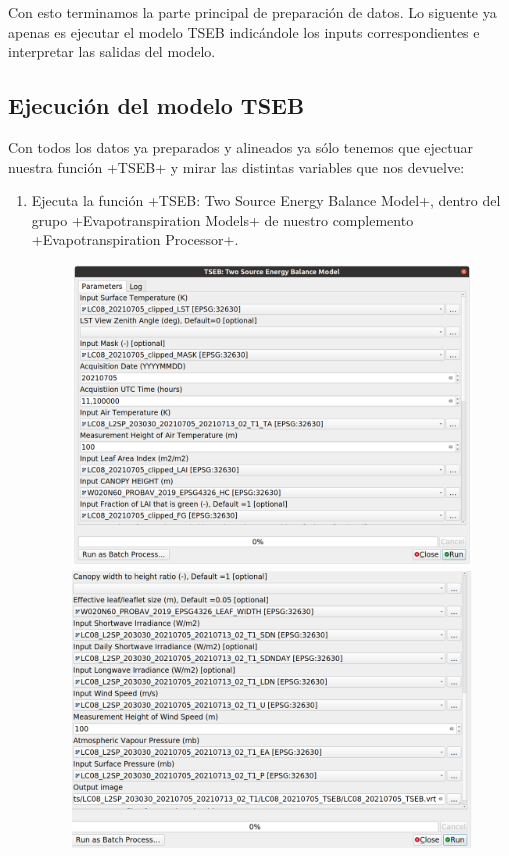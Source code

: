 \documentclass[a4paper,11pt]{article}
\begin{document}
    Con esto terminamos la parte principal de preparación de datos. Lo siguente ya apenas es ejecutar el modelo TSEB indicándole los inputs correspondientes e interpretar las salidas del modelo.
   
   \subsection{Ejecución del modelo TSEB}
    Con todos los datos ya preparados y alineados ya sólo tenemos que ejectuar nuestra función \cverb+TSEB+ y mirar las distintas variables que nos devuelve:
    
    \begin{enumerate}
     \item Ejecuta la función \cverb+TSEB: Two Source Energy Balance Model+, dentro del grupo \cverb+Evapotranspiration Models+ de nuestro complemento \cverb+Evapotranspiration Processor+.
     
     \begin{figure}[H]\centering
      \includegraphics[width=\textwidth]{qgis_tseb_1}
      \includegraphics[width=\textwidth]{qgis_tseb_2}
     \end{figure}
     

\end{enumerate}
\end{document}

